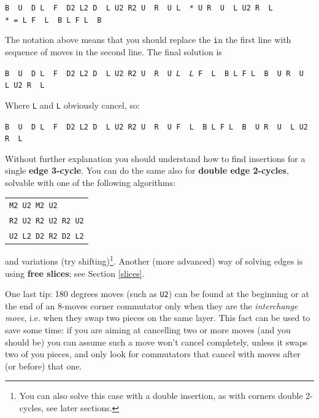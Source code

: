 \documentclass[11pt,a4paper]{book}
\newcommand{\p}{\textquotesingle}
\newcommand{\m}{\texttt}
\newcommand{\ps}{\p\,\,}
\begin{document}
\begin{center}
\m{B\ps U\ps D L\ps F\ps D2 L2 D\ps L U2 R2 U\ps R\ps U L\ps * U R\ps U\ps L U2 R\ps L\p}\\
\m{* = L F\ps L\ps B L F L\ps B\p}
\end{center}

The notation above means that you should replace the \m * in the first line with sequence of moves in the second line. The final solution is

\begin{center}
\m{B\ps U\ps D L\ps F\ps D2 L2 D\ps L U2 R2 U\ps R\ps U \emph{L\ps L} F\ps L\ps B L F L\ps B\ps U R\ps U\ps L U2 R\ps L\p}
\end{center}

Where \m L and \m{L\p} obviously cancel, so:

\begin{center}
\m{B\ps U\ps D L\ps F\ps D2 L2 D\ps L U2 R2 U\ps R\ps U F\ps L\ps B L F L\ps B\ps U R\ps U\ps L U2 R\ps L\p}
\end{center}

Without further explanation you should understand how to find insertions for a single \textbf{edge 3-cycle}. You can do the same also for \textbf{double edge 2-cycles}, solvable with one of the following algorithms:

\begin{center}
\begin{tabular}{l}
\m{M2 U2 M2 U2}\\
\m{R2 U2 R2 U2 R2 U2}\\
\m{U2 L2 D2 R2 D2 L2}
\end{tabular}
\end{center}

and variations (try shifting)\footnote{You can also solve this case with a double insertion, as with corners double 2-cycles, see later sections.}. Another (more advanced) way of solving edges is using \textbf{free slices}; see Section \ref{slices}.

One last tip: 180 degrees moves (such as \m{U2}) can be found at the beginning or at the end of an 8-moves corner commutator only when they are the \emph{interchange move}, i.e. when they swap two pieces on the same layer. This fact can be used to save some time: if you are aiming at cancelling two or more moves (and you should be) you can assume such a move won't cancel completely, unless it swaps two of you pieces, and only look for commutators that cancel with moves after (or before) that one.
\end{document}
